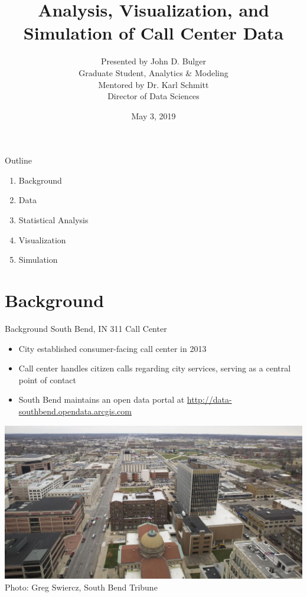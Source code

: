 \documentclass{beamer}
\title[Call Center Analysis]{Analysis, Visualization, and Simulation of Call Center Data} %
\author[Bulger \and Schmitt]{Presented by John D. Bulger\\ Graduate Student, Analytics \& Modeling
\\ \vskip0.1in Mentored by Dr. Karl Schmitt\\ Director of Data Sciences}
\institute[VERUM]{Valparaiso University}
\date{May 3, 2019}
\begin{document}
\begin{frame}
\titlepage
\end{frame}


\begin{frame}{Outline}
\begin{enumerate}
    \item Background
    \medskip
    \item Data
    \medskip
    \item Statistical Analysis
    \medskip
    \item Visualization
    \medskip
    \item Simulation
\end{enumerate}
\end{frame}




\section{Background}


\begin{frame}{Background}
South Bend, IN 311 Call Center
\begin{itemize}
	\item City established consumer-facing call center in 2013
	\item Call center handles citizen calls regarding city services, serving as a central point of contact
	\item South Bend maintains an open data portal at \url{http://data-southbend.opendata.arcgis.com}
\end{itemize} 
\includegraphics[scale=0.1]{south_bend}
\tiny{Photo:  Greg Swiercz, South Bend Tribune}   
\end{frame}
\end{document}
